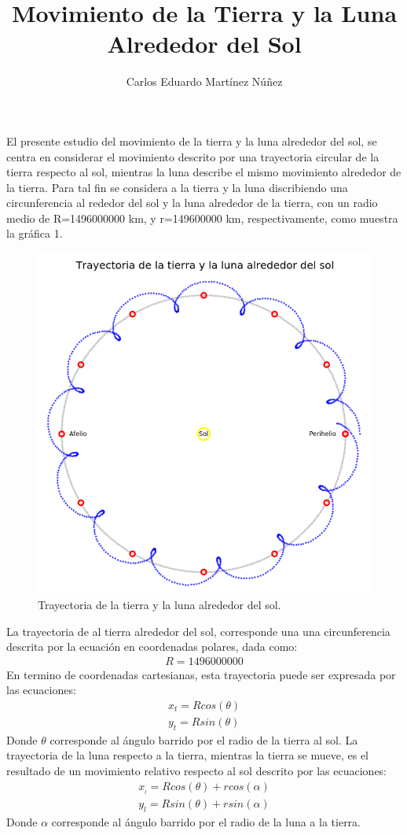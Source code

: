 \documentclass[12pt,a4paper,twoside]{article}
\author{Carlos Eduardo Martínez Núñez}
\title{\textbf{Movimiento de la Tierra y la Luna Alrededor del Sol}}
\begin{document}
\maketitle
El presente estudio del movimiento de la tierra y la luna alrededor del sol, se centra en considerar el movimiento descrito por una trayectoria circular de la tierra respecto al sol, mientras la luna describe el mismo movimiento alrededor de la tierra. Para tal fin se considera a la tierra y la luna discribiendo una circunferencia al rededor del sol y la luna alrededor de la tierra, con un radio medio de R=1496000000 km, y r=149600000 km, respectivamente, como muestra la gráfica 1. 
\begin{figure}[htbp]
\centering
\includegraphics[width=12cm]{Trlunatierra.png}
\caption{Trayectoria de la tierra y la luna alrededor del sol.}\label{fig:figura1}
\end{figure}
La trayectoria de al tierra alrededor del sol, corresponde una una circunferencia descrita por la ecuación en coordenadas polares, dada como:
\begin{eqnarray}
R=1496000000
\end{eqnarray}
En termino de coordenadas cartesianas, esta trayectoria puede ser expresada por las ecuaciones:
\begin{eqnarray}
x_{t}=Rcos(\theta)\\
y_{t}=Rsin(\theta)
\end{eqnarray}
Donde $\theta$ corresponde al ángulo barrido por el radio de la tierra al sol.
La trayectoria de la luna respecto a la tierra, mientras la tierra se mueve, es el resultado de un movimiento relativo respecto al sol descrito por las ecuaciones:
\begin{eqnarray}
x_{_{l}}=Rcos(\theta)+rcos(\alpha)\\
y_{l}=Rsin(\theta)+rsin(\alpha)
\end{eqnarray}
Donde $\alpha$ corresponde al ángulo barrido por el radio de la luna a la tierra.
\end{document}
